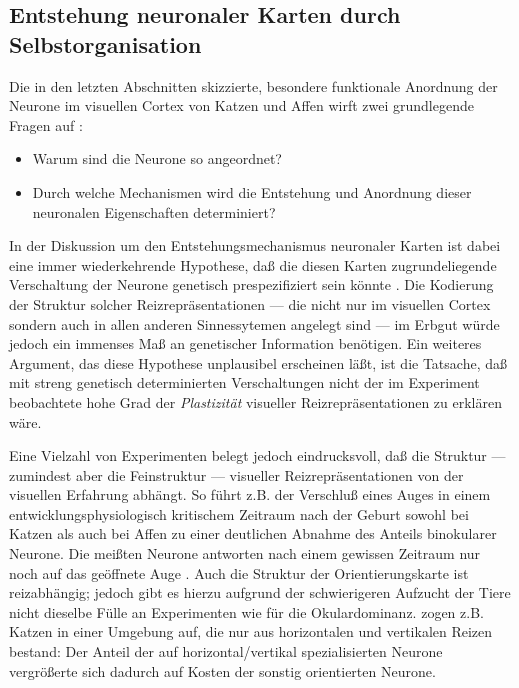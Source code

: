 \subsection{Entstehung neuronaler Karten durch Selbstorganisation}
\label{plastizitaet}

Die in den letzten Abschnitten skizzierte, besondere funktionale Anordnung
der Neurone im visuellen Cortex von Katzen und Affen wirft zwei
grundlegende Fragen auf \cite{marlsburg:1973}:

\begin{itemize}
    \item Warum sind die Neurone so angeordnet?
    \item Durch welche Mechanismen wird die Entstehung und Anordnung dieser
    neuronalen Eigenschaften determiniert?
\end{itemize}

In der Diskussion um den Entstehungsmechanismus neuronaler Karten ist dabei
eine immer wiederkehrende Hypothese, daß die diesen Karten
zugrundeliegende Verschaltung der Neurone genetisch prespezifiziert sein
könnte \parencite[vgl.][]{wiesel:1974,goedecke:1996}. Die Kodierung der
Struktur solcher Reizrepräsentationen --- die nicht nur im visuellen
Cortex sondern auch in allen anderen Sinnessytemen angelegt sind --- im
Erbgut würde jedoch ein immenses Maß an genetischer Information
benötigen. Ein weiteres Argument, das diese Hypothese unplausibel
erscheinen läßt, ist die Tatsache, daß mit streng genetisch
determinierten Verschaltungen nicht der im Experiment beobachtete hohe Grad
der \emph{Plastizität} visueller Reizrepräsentationen zu erklären wäre.

Eine Vielzahl von Experimenten belegt jedoch eindrucksvoll, daß die
Struktur --- zumindest aber die Feinstruktur --- visueller
Reizrepräsentationen von der visuellen Erfahrung abhängt. So führt
z.B. der Verschluß eines Auges in einem entwicklungsphysiologisch
kritischem Zeitraum nach der Geburt sowohl bei Katzen als auch bei Affen zu
einer deutlichen Abnahme des Anteils binokularer Neurone. Die meißten
Neurone antworten nach einem gewissen Zeitraum nur noch auf das geöffnete
Auge \parencite[siehe z.B.][]{shatz:1978,levay:1980}. Auch die Struktur der
Orientierungskarte ist reizabhängig; jedoch gibt es hierzu aufgrund der
schwierigeren Aufzucht der Tiere nicht dieselbe Fülle an Experimenten wie
für die Okulardominanz. \textcite{blakemore:1970} zogen z.B. Katzen in
einer Umgebung auf, die nur aus horizontalen und vertikalen Reizen bestand:
Der Anteil der auf horizontal/vertikal spezialisierten Neurone
vergrößerte sich dadurch auf Kosten der sonstig orientierten Neurone.

